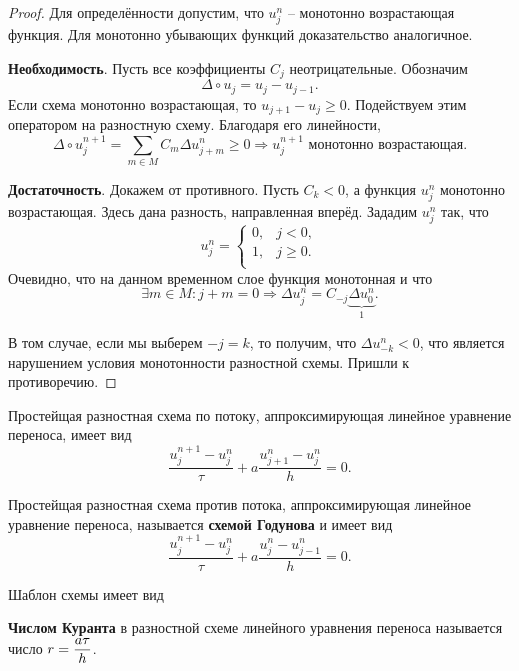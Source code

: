 \documentclass{article}
\begin{document}
\begin{proof}
	Для определённости допустим, что $u_j^n$ -- монотонно возрастающая
	функция. Для монотонно убывающих функций доказательство аналогичное.
	
	\textbf{Необходимость}. Пусть все коэффициенты $C_j$ неотрицательные.
	Обозначим
	\[\Delta\circ u_j=u_j-u_{j-1}.\]
	Если схема монотонно возрастающая, то $u_{j+1}-u_j\ge 0$. Подействуем
	этим оператором на разностную схему. Благодаря его линейности,
	\[\Delta\circ u_j^{n+1}=\sum_{m\in M}C_m\Delta u_{j+m}^{n}\ge 0
	\Rightarrow u_j^{n+1}\text{ монотонно возрастающая}.\]

	\textbf{Достаточность}. Докажем от противного. Пусть $C_k<0$, а функция
	$u_j^n$ монотонно возрастающая. Здесь дана разность, направленная
	вперёд. Зададим $u_j^n$ так, что
	\[
		u_j^n=
		\begin{cases}
			0, & j < 0, \\
			1, & j\ge 0. \\
		\end{cases}
	\]
	Очевидно, что на данном временном слое функция монотонная и что
	\[\exists m\in M:j+m=0\Rightarrow
	\Delta u_j^n=C_{-j}\underset{1}{\underbrace{\Delta u_0^n}}.\]

	В том случае, если мы выберем $-j=k$, то получим, что
	$\Delta u_{-k}^n<0$, что является нарушением условия монотонности
	разностной схемы. Пришли к противоречию.
\end{proof}

\begin{define}\label{eq:CDE_forward_scheme}
	Простейщая разностная схема по потоку, аппроксимирующая линейное
	уравнение переноса, имеет вид
	\[\frac{u_j^{n+1}-u_j^n}{\tau}+a\frac{u_{j+1}^n-u_j^n}{h}=0.\]
\end{define}

\begin{define}\label{eq:godunov_scheme}
	Простейщая разностная схема против потока, аппроксимирующая линейное
	уравнение переноса, называется \textbf{схемой Годунова} и имеет вид
	\[\frac{u_j^{n+1}-u_j^n}{\tau}+a\frac{u_j^n-u_{j-1}^n}{h}=0.\]

	Шаблон схемы имеет вид \\

	
\end{define}


\begin{define}\label{eq:courant_number}
	\textbf{Числом Куранта} в разностной схеме линейного уравнения переноса
	называется число $\mathlarger{r=\frac{a\tau}{h}}$.
\end{define}
\end{document}
